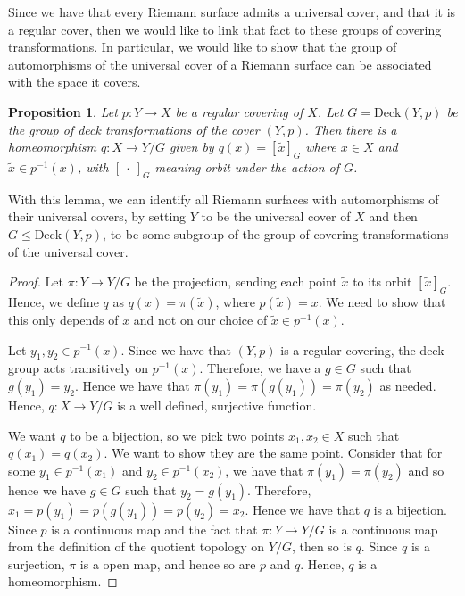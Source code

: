 \documentclass[11pt]{report}
\newtheorem{prop}[thm]{Proposition}
\theoremstyle{definition}
\begin{document}
Since we have that every Riemann surface admits a universal cover, and that it is a regular cover, then we would like to link that fact to these groups of covering transformations. In particular, we would like to show that the group of automorphisms of the universal cover of a Riemann surface can be associated with the space it covers.
\begin{prop}
  Let $p:Y \rightarrow X$ be a regular covering of $X$. Let $G = \text{Deck}(Y,p)$ be the group of deck transformations of the cover $(Y,p)$. Then there is a homeomorphism $q:X\rightarrow Y/G$ given by $q(x)=[\tilde{x}]_G$ where $x \in X$ and $\tilde{x} \in p^{-1}(x)$, with $[\: \cdot \: ]_G$ meaning orbit under the action of $G$. 
\end{prop}
With this lemma, we can identify all Riemann surfaces with automorphisms of their universal covers, by setting $Y$ to be the universal cover of $X$ and then $G \leq \text{Deck}(Y,p)$, to be some subgroup of the group of covering transformations of the universal cover.
\begin{proof}
  Let $\pi : Y \rightarrow Y/G$ be the projection, sending each point $\tilde{x}$ to its orbit $[\tilde{x}]_G$. Hence, we define $q$ as $q(x) = \pi(\tilde{x})$, where $p(\tilde{x})=x$. We need to show that this only depends of $x$ and not on our choice of $\tilde{x} \in p^{-1}(x)$. 
  
  Let $y_1,y_2 \in p^{-1}(x)$. Since we have that $(Y,p)$ is a regular covering, the deck group acts transitively on $p^{-1}(x)$. Therefore, we have a $g \in G$ such that $g(y_1) = y_2$. Hence we have that $\pi(y_1) = \pi(g(y_1))=\pi(y_2)$ as needed. Hence, $q:X \rightarrow Y/G$ is a well defined, surjective function. 
  
  We want $q$ to be a bijection, so we pick two points $x_1,x_2 \in X$ such that $q(x_1)=q(x_2)$. We want to show they are the same point. Consider that for some $y_1 \in p^{-1}(x_1)$ and $y_2 \in p^{-1}(x_2)$, we have that $\pi(y_1) = \pi(y_2)$ and so hence we have $g \in G$ such that $y_2 = g(y_1)$. Therefore, $x_1 = p(y_1) = p(g(y_1))=p(y_2)=x_2$. Hence we have that $q$ is a bijection. Since $p$ is a continuous map and the fact that $\pi:Y \rightarrow Y/G$ is a continuous map from the definition of the quotient topology on $Y/G$, then so is $q$. Since $q$ is a surjection, $\pi$ is a open map, and hence so are $p$ and $q$. Hence, $q$ is a homeomorphism.
\end{proof}
\end{document}
